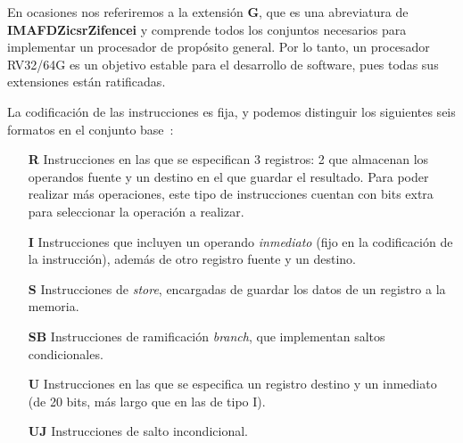 En ocasiones nos referiremos a la extensión \textbf{G}, que es una abreviatura de \textbf{IMAFDZicsrZifencei} y comprende todos los conjuntos necesarios para implementar un procesador de propósito general. Por lo tanto, un procesador RV32/64G es un objetivo estable para el desarrollo de software, pues todas sus extensiones están ratificadas.


% 


La codificación de las instrucciones es fija, y podemos distinguir los siguientes seis formatos en el conjunto base~\cite{BerkeleyCS61C7}:

\begin{itemize}[noitemsep]
    \item [\textbf{R}] Instrucciones en las que se especifican 3 registros: 2 que almacenan los operandos fuente y un destino en el que guardar el resultado. Para poder realizar más operaciones, este tipo de instrucciones cuentan con bits extra para seleccionar la operación a realizar.
    \item [\textbf{I}] Instrucciones que incluyen un operando \textit{inmediato} (fijo en la codificación de la instrucción), además de otro registro fuente y un destino.
    \item [\textbf{S}] Instrucciones de \textit{store}, encargadas de guardar los datos de un registro a la memoria.
    \item [\textbf{SB}] Instrucciones de ramificación \textit{branch}, que implementan saltos condicionales.
    \item [\textbf{U}] Instrucciones en las que se especifica un registro destino y un inmediato (de 20 bits, más largo que en las de tipo I).
    \item [\textbf{UJ}] Instrucciones de salto incondicional.
\end{itemize}




